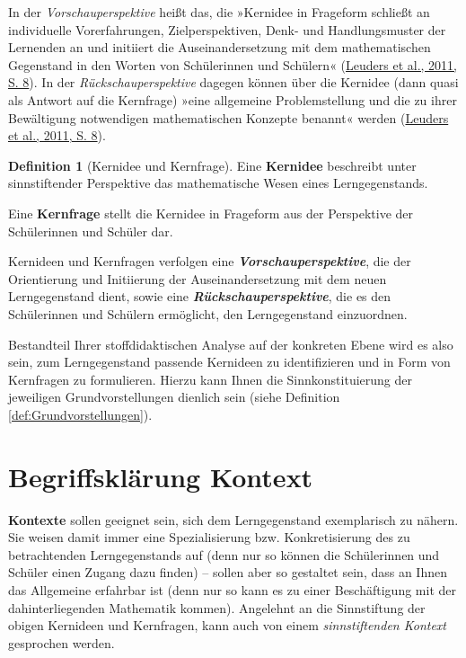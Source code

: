 \documentclass[
]{scrbook}
\theoremstyle{definition}
\newtheorem{definition}{Definition}[chapter]
\theoremstyle{definition}
\theoremstyle{definition}
\theoremstyle{definition}
\theoremstyle{remark}
\begin{document}
In der \emph{Vorschauperspektive} heißt das, die »Kernidee in Frageform schließt an individuelle Vorerfahrungen, Zielperspektiven, Denk- und Handlungsmuster der Lernenden an und initiiert die Auseinandersetzung mit dem mathematischen Gegenstand in den Worten von Schülerinnen und Schülern« (\protect\hyperlink{ref-Leuders2011}{Leuders et al., 2011, S. 8}). In der \emph{Rückschauperspektive} dagegen können über die Kernidee (dann quasi als Antwort auf die Kernfrage) »eine allgemeine Problemstellung und die zu ihrer Bewältigung notwendigen mathematischen Konzepte benannt« werden (\protect\hyperlink{ref-Leuders2011}{Leuders et al., 2011, S. 8}).

\begin{definition}[Kernidee und Kernfrage]
\protect\hypertarget{def:Kernidee}{}\label{def:Kernidee}Eine \textbf{Kernidee} beschreibt unter sinnstiftender Perspektive das mathematische Wesen eines Lerngegenstands.

Eine \textbf{Kernfrage} stellt die Kernidee in Frageform aus der Perspektive der Schülerinnen und Schüler dar.

Kernideen und Kernfragen verfolgen eine \textbf{\emph{Vorschauperspektive}}, die der Orientierung und Initiierung der Auseinandersetzung mit dem neuen Lerngegenstand dient, sowie eine \textbf{\emph{Rückschauperspektive}}, die es den Schülerinnen und Schülern ermöglicht, den Lerngegenstand einzuordnen.
\end{definition}

Bestandteil Ihrer stoffdidaktischen Analyse auf der \textcolor{concreteColor}{konkreten Ebene} wird es also sein, zum Lerngegenstand passende Kernideen zu identifizieren und in Form von Kernfragen zu formulieren. Hierzu kann Ihnen die Sinnkonstituierung der jeweiligen Grundvorstellungen dienlich sein (siehe Definition \ref{def:Grundvorstellungen}).

\hypertarget{kontexte-begriffsklaerung}{%
\section{Begriffsklärung Kontext}\label{kontexte-begriffsklaerung}}

\textbf{Kontexte} sollen geeignet sein, sich dem Lerngegenstand exemplarisch zu nähern. Sie weisen damit immer eine Spezialisierung bzw. Konkretisierung des zu betrachtenden Lerngegenstands auf (denn nur so können die Schülerinnen und Schüler einen Zugang dazu finden) -- sollen aber so gestaltet sein, dass an Ihnen das Allgemeine erfahrbar ist (denn nur so kann es zu einer Beschäftigung mit der dahinterliegenden Mathematik kommen). Angelehnt an die Sinnstiftung der obigen Kernideen und Kernfragen, kann auch von einem \emph{sinnstiftenden Kontext} gesprochen werden.
\end{document}
